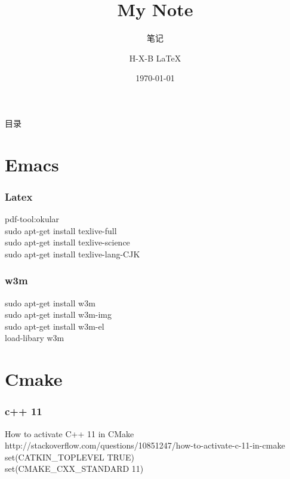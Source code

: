 \documentclass{beamer}
\begin{document}
\begin{CJK}{UTF8}{gkai}   %

  \title{My Note}
  \subtitle{笔记}
  \author{H-X-B \LaTeX{} }
  \date{\today}

\frame{\titlepage}

\begin{frame}{目录}
  \tableofcontents
\end{frame}

\section{Emacs}

 \begin{frame}\frametitle{Latex}
   pdf-tool:okular\\
   sudo apt-get install texlive-full\\
   sudo apt-get install texlive-science\\
   sudo apt-get install texlive-lang-CJK\\
 \end{frame}

 \begin{frame}\frametitle{w3m}
   sudo apt-get install w3m\\
   sudo apt-get install w3m-img\\
   sudo apt-get install w3m-el\\
   load-libary w3m\\
 \end{frame}

\section{Cmake}

 \begin{frame}\frametitle{c++ 11}
   How to activate C++ 11 in CMake \\
   http://stackoverflow.com/questions/10851247/how-to-activate-c-11-in-cmake\\
   set(CATKIN\_TOPLEVEL TRUE)\\
   set(CMAKE\_CXX\_STANDARD 11)\\
 \end{frame}


\end{CJK}
\end{document}
